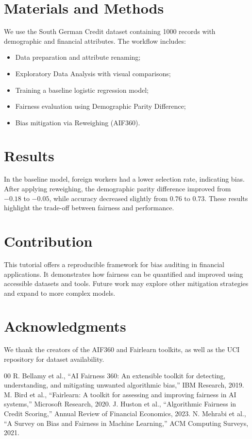 \documentclass[conference]{IEEEtran}
\begin{document}
\section{Materials and Methods}
We use the South German Credit dataset containing 1000 records with demographic and financial attributes. The workflow includes:
\begin{itemize}
    \item Data preparation and attribute renaming;
    \item Exploratory Data Analysis with visual comparisons;
    \item Training a baseline logistic regression model;
    \item Fairness evaluation using Demographic Parity Difference;
    \item Bias mitigation via Reweighing (AIF360).
\end{itemize}

\section{Results}
In the baseline model, foreign workers had a lower selection rate, indicating bias. After applying reweighing, the demographic parity difference improved from $-0.18$ to $-0.05$, while accuracy decreased slightly from $0.76$ to $0.73$. These results highlight the trade-off between fairness and performance.

\section{Contribution}
This tutorial offers a reproducible framework for bias auditing in financial applications. It demonstrates how fairness can be quantified and improved using accessible datasets and tools. Future work may explore other mitigation strategies and expand to more complex models.

\section*{Acknowledgments}
We thank the creators of the AIF360 and Fairlearn toolkits, as well as the UCI repository for dataset availability.

\begin{thebibliography}{00}
 R. Bellamy et al., ``AI Fairness 360: An extensible toolkit for detecting, understanding, and mitigating unwanted algorithmic bias,'' IBM Research, 2019.
 M. Bird et al., ``Fairlearn: A toolkit for assessing and improving fairness in AI systems,'' Microsoft Research, 2020.
 J. Huston et al., ``Algorithmic Fairness in Credit Scoring,'' Annual Review of Financial Economics, 2023.
 N. Mehrabi et al., ``A Survey on Bias and Fairness in Machine Learning,'' ACM Computing Surveys, 2021.
\end{thebibliography}
\end{document}
